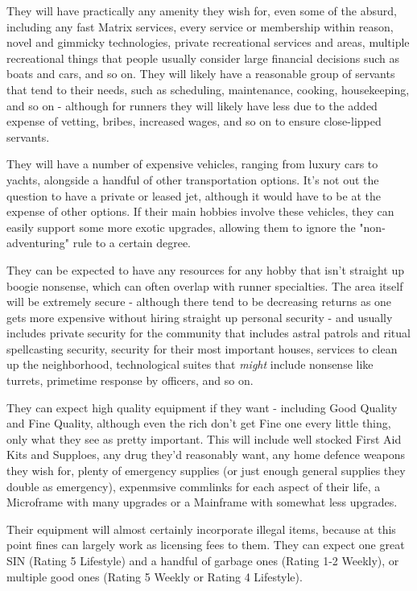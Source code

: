\begin{multicols}{2}
\begin{coloredbox}
	They will have practically any amenity they wish for, even some of the absurd, including any fast Matrix services, every service or membership within reason, novel and gimmicky technologies, private recreational services and areas, multiple recreational things that people usually consider large financial decisions such as boats and cars, and so on. They will likely have a reasonable group of servants that tend to their needs, such as scheduling, maintenance, cooking, housekeeping, and so on - although for runners they will likely have less due to the added expense of vetting, bribes, increased wages, and so on to ensure close-lipped servants.
	
	They will have a number of expensive vehicles, ranging from luxury cars to yachts, alongside a handful of other transportation options. It's not out the question to have a private or leased jet, although it would have to be at the expense of other options. If their main hobbies involve these vehicles, they can easily support some more exotic upgrades, allowing them to ignore the "non-adventuring" rule to a certain degree.
	
	They can be expected to have any resources for any hobby that isn't straight up boogie nonsense, which can often overlap with runner specialties. The area itself will be extremely secure - although there tend to be decreasing returns as one gets more expensive without hiring straight up personal security - and usually includes private security for the community that includes astral patrols and ritual spellcasting security, security for their most important houses, services to clean up the neighborhood, technological suites that \textit{might} include nonsense like turrets, primetime response by officers, and so on.
	
	They can expect high quality equipment if they want - including Good Quality and Fine Quality, although even the rich don't get Fine one every little thing, only what they see as pretty important. This will include well stocked First Aid Kits and Supploes, any drug they'd reasonably want, any home defence weapons they wish for, plenty of emergency supplies (or just enough general supplies they double as emergency), expenmsive commlinks for each aspect of their life, a Microframe with many upgrades or a Mainframe with somewhat less upgrades. 
	
	Their equipment will almost certainly incorporate illegal items, because at this point fines can largely work as licensing fees to them. They can expect one great SIN (Rating 5 Lifestyle) and a handful of garbage ones (Rating 1-2 Weekly), or multiple good ones (Rating 5 Weekly or Rating 4 Lifestyle).
	

\end{coloredbox}
\end{multicols}
